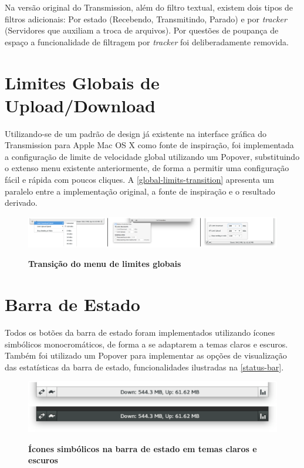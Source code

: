 Na versão original do Transmission, além do filtro textual, existem dois tipos
de filtros adicionais: Por estado (Recebendo, Transmitindo, Parado) e por
\textit{tracker} (Servidores que auxiliam a troca de arquivos). Por questões de
poupança de espaço a funcionalidade de filtragem por \textit{tracker} foi
deliberadamente removida.

\section{Limites Globais de Upload/Download}

Utilizando-se de um padrão de design já existente na interface gráfica do
Transmission para Apple Mac OS X como fonte de inspiração, foi implementada a
configuração de limite de velocidade global utilizando um Popover, substituindo
o extenso menu existente anteriormente, de forma a permitir uma configuração
fácil e rápida com poucos cliques. A \autoref{global-limits-transition}
apresenta um paralelo entre a implementação original, a fonte de inspiração e o
resultado derivado.

\begin{figure}[!h]
  \begin{center}
    \caption{\textbf{Transição do menu de limites globais}}
    \includegraphics [width=\textwidth]{image/global-limits-transition.eps}
    \label{global-limits-transition}
  \end{center}
\end{figure}

\section{Barra de Estado}

Todos os botões da barra de estado foram implementados utilizando ícones
simbólicos monocromáticos, de forma a se adaptarem a temas claros e escuros.
Também foi utilizado um Popover para implementar as opções de visualização das
estatísticas da barra de estado, funcionalidades ilustradas na 
\autoref{status-bar}.

\begin{figure}[!h]
  \begin{center}
    \caption{\textbf{Ícones simbólicos na barra de estado em temas claros e escuros}}
    \includegraphics [width=\textwidth]{image/status-bar.eps}
    \label{status-bar}
  \end{center}
\end{figure}
